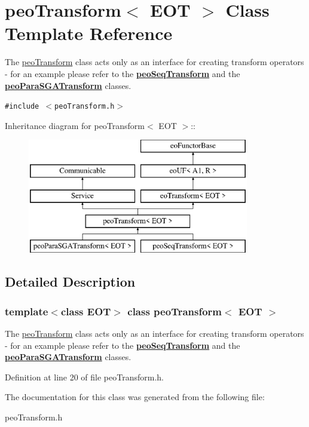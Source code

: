 \hypertarget{classpeoTransform}{
\section{peo\-Transform$<$ EOT $>$ Class Template Reference}
\label{classpeoTransform}
}
The \hyperlink{classpeoTransform}{peo\-Transform} class acts only as an interface for creating transform operators - for an example please refer to the {\bf \hyperlink{classpeoSeqTransform}{peo\-Seq\-Transform}} and the {\bf \hyperlink{classpeoParaSGATransform}{peo\-Para\-SGATransform}} classes.  


{\tt \#include $<$peo\-Transform.h$>$}

Inheritance diagram for peo\-Transform$<$ EOT $>$::\begin{figure}[H]
\begin{center}
\leavevmode
\includegraphics[height=5cm]{classpeoTransform}
\end{center}
\end{figure}


\subsection{Detailed Description}
\subsubsection*{template$<$class EOT$>$ class peo\-Transform$<$ EOT $>$}

The \hyperlink{classpeoTransform}{peo\-Transform} class acts only as an interface for creating transform operators - for an example please refer to the {\bf \hyperlink{classpeoSeqTransform}{peo\-Seq\-Transform}} and the {\bf \hyperlink{classpeoParaSGATransform}{peo\-Para\-SGATransform}} classes. 



Definition at line 20 of file peo\-Transform.h.

The documentation for this class was generated from the following file:\begin{CompactItemize}
\item 
peo\-Transform.h\end{CompactItemize}
